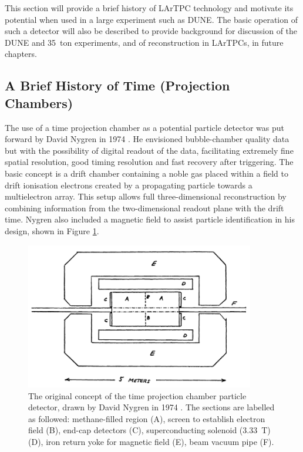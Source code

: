 This section will provide a brief history of LArTPC technology and motivate its potential when used in a large experiment such as DUNE.  The basic operation of such a detector will also be described to provide background for discussion of the DUNE and 35~ton experiments, and of reconstruction in LArTPCs, in future chapters.

\subsection{A Brief History of Time (Projection Chambers)}\label{sec:LArTPCHistory}

The use of a time projection chamber as a potential particle detector was put forward by David Nygren in 1974 \cite{Nygren1974}.  He envisioned bubble-chamber quality data but with the possibility of digital readout of the data, facilitating extremely fine spatial resolution, good timing resolution and fast recovery after triggering.  The basic concept is a drift chamber containing a noble gas placed within a field to drift ionisation electrons created by a propagating particle towards a multielectron array.  This setup allows full three-dimensional reconstruction by combining information from the two-dimensional readout plane with the drift time.  Nygren also included a magnetic field to assist particle identification in his design, shown in Figure \ref{fig:NygrenTPC}.

\begin{figure}
  \centering
  \includegraphics[width=10cm]{NygrenTPC.png}
  \caption[Original TPC design, Nygren (1974)]{The original concept of the time projection chamber particle detector, drawn by David Nygren in 1974 \cite{Nygren1974}.  The sections are labelled as followed: methane-filled region (A), screen to establish electron field (B), end-cap detectors (C), superconducting solenoid (3.33~T) (D), iron return yoke for magnetic field (E), beam vacuum pipe (F).}
  \label{fig:NygrenTPC}
\end{figure}


